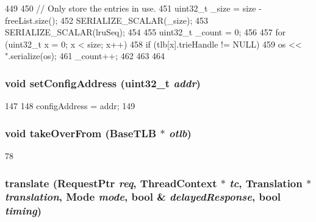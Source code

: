 \begin{DoxyCode}
449 {
450     // Only store the entries in use.
451     uint32_t _size = size - freeList.size();
452     SERIALIZE_SCALAR(_size);
453     SERIALIZE_SCALAR(lruSeq);
454 
455     uint32_t _count = 0;
456 
457     for (uint32_t x = 0; x < size; x++) {
458         if (tlb[x].trieHandle != NULL) {
459             os << ".serialize(os);
461             _count++;
462         }
463     }
464 }
\end{DoxyCode}
\hypertarget{classX86ISA_1_1TLB_ae9a8e1a2483b506a07feeeea766ba43e}{
\subsubsection[{setConfigAddress}]{\setlength{\rightskip}{0pt plus 5cm}void setConfigAddress ({\bf uint32\_\-t} {\em addr})}}
\label{classX86ISA_1_1TLB_ae9a8e1a2483b506a07feeeea766ba43e}



\begin{DoxyCode}
147 {
148     configAddress = addr;
149 }
\end{DoxyCode}
\hypertarget{classX86ISA_1_1TLB_a15b6c15c1be2ca4de3e65772a02aa29f}{
\subsubsection[{takeOverFrom}]{\setlength{\rightskip}{0pt plus 5cm}void takeOverFrom ({\bf BaseTLB} $\ast$ {\em otlb})}}
\label{classX86ISA_1_1TLB_a15b6c15c1be2ca4de3e65772a02aa29f}



\begin{DoxyCode}
78 {}
\end{DoxyCode}
\hypertarget{classX86ISA_1_1TLB_a8b22251fd759b80bb032b04e7f2fc68a}{
\subsubsection[{translate}]{ translate ({\bf RequestPtr} {\em req}, \/  {\bf ThreadContext} $\ast$ {\em tc}, \/  {\bf Translation} $\ast$ {\em translation}, \/  {\bf Mode} {\em mode}, \/  bool \& {\em delayedResponse}, \/  bool {\em timing})}}
\label{classX86ISA_1_1TLB_a8b22251fd759b80bb032b04e7f2fc68a}



